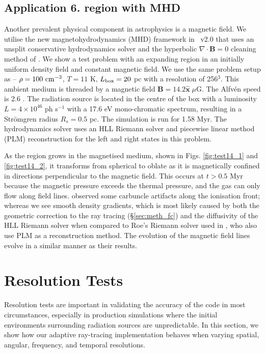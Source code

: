 \documentclass[useAMS,usenatbib]{mn2e}
\begin{document}
\subsection{Application 6. \hii region with MHD}

Another prevalent physical component in astrophysics is a magnetic
field.  We utilise the new magnetohydrodynamics (MHD) framework
\citep{Wang09} in \enzo~v2.0 that uses an unsplit conservative
hydrodynamics solver and the hyperbolic $\nabla \cdot \mathbf{B} = 0$
cleaning method of \citet{Dedner02}.  We show a test problem with an
expanding \hii region in an initially uniform density field and
constant magnetic field.  We use the same problem setup as
\citet{Krumholz07_ART} -- $\rho = 100~\cubecm$, $T = 11$ K, $L_{\rm
  box} = 20$ pc with a resolution of 256$^3$.  This ambient medium is
threaded by a magnetic field $\mathbf{B} = 14.2 \hat{\mathbf{x}} \;
\mu\mathrm{G}$.  The Alfv\'{e}n speed is 2.6 \kms.  The radiation
source is located in the centre of the box with a luminosity $L = 4
\times 10^{46}$ ph s$^{-1}$ with a 17.6 eV mono-chromatic spectrum,
resulting in a Str\"{o}mgren radius $R_s = 0.5$ pc.  The simulation is
run for 1.58 Myr.  The hydrodynamics solver uses an HLL Riemann solver
\citep{HLL} and piecewise linear method (PLM) reconstruction
\citep{PLM} for the left and right states in this problem.

As the \hii region grows in the magnetised medium, shown in
Figs. \ref{fig:test14_1} and \ref{fig:test14_2}, it transforms from
spherical to oblate as it is magnetically confined in directions
perpendicular to the magnetic field.  This occurs at $t > 0.5$ Myr
because the magnetic pressure exceeds the thermal pressure, and the
gas can only flow along field lines.  \citeauthor{Krumholz07_ART}
observed some carbuncle artifacts along the ionisation front; whereas
we see smooth density gradients, which is most likely caused by both
the geometric correction to the ray tracing (\S\ref{sec:meth_fc}) and
the diffusivity of the HLL Riemann solver when compared to Roe's
Riemann solver used in \citet{Krumholz07_ART}, who also use PLM as a
reconstruction method.  The evolution of the magnetic field lines
evolve in a similar manner as their results.

\section{Resolution Tests}

Resolution tests are important in validating the accuracy of the code
in most circumstances, especially in production simulations where the
initial environments surrounding radiation sources are unpredictable.
In this section, we show how our adaptive ray-tracing implementation
behaves when varying spatial, angular, frequency, and temporal
resolutions.
\end{document}
